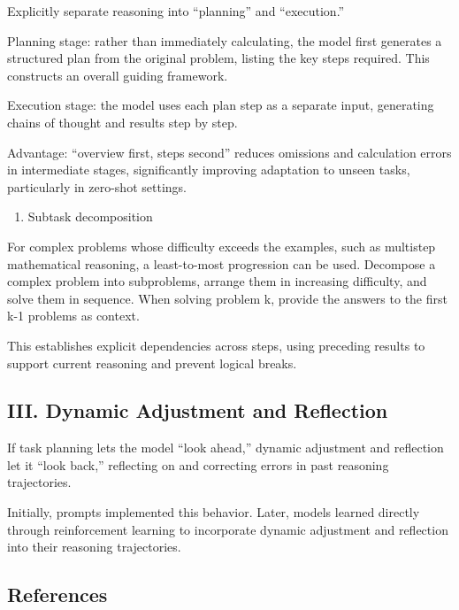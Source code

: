 Explicitly separate reasoning into ``planning'' and ``execution.''

Planning stage: rather than immediately calculating, the model first generates a structured plan from the original problem, listing the key steps required. This constructs an overall guiding framework.

Execution stage: the model uses each plan step as a separate input, generating chains of thought and results step by step.

Advantage: ``overview first, steps second'' reduces omissions and calculation errors in intermediate stages, significantly improving adaptation to unseen tasks, particularly in zero-shot settings.

\begin{enumerate}
\def\labelenumi{\arabic{enumi}.}
\setcounter{enumi}{1}
\tightlist
\item
  Subtask decomposition
\end{enumerate}

For complex problems whose difficulty exceeds the examples, such as multistep mathematical reasoning, a least-to-most progression can be used. Decompose a complex problem into subproblems, arrange them in increasing difficulty, and solve them in sequence. When solving problem k, provide the answers to the first k-1 problems as context.

This establishes explicit dependencies across steps, using preceding results to support current reasoning and prevent logical breaks.

\hypertarget{iii.-dynamic-adjustment-and-reflection}{%
\subsection{III. Dynamic Adjustment and Reflection}\label{iii.-dynamic-adjustment-and-reflection}}

If task planning lets the model ``look ahead,'' dynamic adjustment and reflection let it ``look back,'' reflecting on and correcting errors in past reasoning trajectories.

Initially, prompts implemented this behavior. Later, models learned directly through reinforcement learning to incorporate dynamic adjustment and reflection into their reasoning trajectories.

\FloatBarrier
{}
\hypertarget{references-119}{%
\subsection{References}\label{references-119}}

